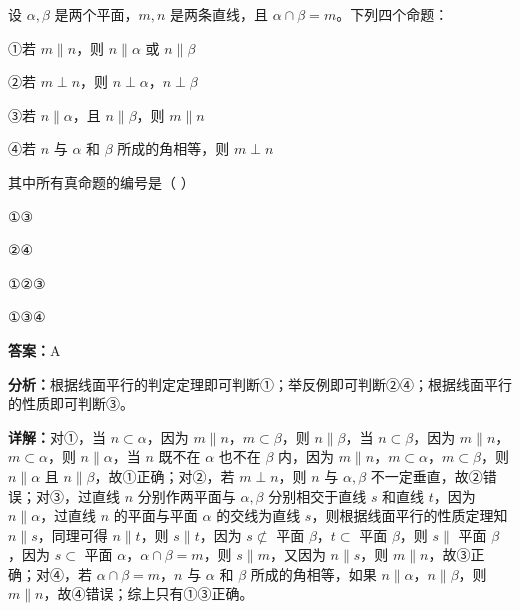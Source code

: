 \begin{question}[points=5]
设 $\alpha,\beta$ 是两个平面，$m,n$ 是两条直线，且 $\alpha\cap\beta=m$。下列四个命题：

①若 $m\parallel n$，则 $n\parallel\alpha$ 或 $n\parallel\beta$

②若 $m\perp n$，则 $n\perp\alpha$，$n\perp\beta$

③若 $n\parallel\alpha$，且 $n\parallel\beta$，则 $m\parallel n$

④若 $n$ 与 $\alpha$ 和 $\beta$ 所成的角相等，则 $m\perp n$

其中所有真命题的编号是（   ）
\begin{choices}
  \item ①③
  \item ②④
  \item ①②③
  \item ①③④
\end{choices}
\begin{solution}
\textbf{答案：}A

\textbf{分析：}根据线面平行的判定定理即可判断①；举反例即可判断②④；根据线面平行的性质即可判断③。

\textbf{详解：}对①，当 $n\subset\alpha$，因为 $m\parallel n$，$m\subset\beta$，则 $n\parallel\beta$，当 $n\subset\beta$，因为 $m\parallel n$，$m\subset\alpha$，则 $n\parallel\alpha$，当 $n$ 既不在 $\alpha$ 也不在 $\beta$ 内，因为 $m\parallel n$，$m\subset\alpha$，$m\subset\beta$，则 $n\parallel\alpha$ 且 $n\parallel\beta$，故①正确；对②，若 $m\perp n$，则 $n$ 与 $\alpha,\beta$ 不一定垂直，故②错误；对③，过直线 $n$ 分别作两平面与 $\alpha,\beta$ 分别相交于直线 $s$ 和直线 $t$，因为 $n\parallel\alpha$，过直线 $n$ 的平面与平面 $\alpha$ 的交线为直线 $s$，则根据线面平行的性质定理知 $n\parallel s$，同理可得 $n\parallel t$，则 $s\parallel t$，因为 $s\not\subset$ 平面 $\beta$，$t\subset$ 平面 $\beta$，则 $s\parallel$ 平面 $\beta$，因为 $s\subset$ 平面 $\alpha$，$\alpha\cap\beta=m$，则 $s\parallel m$，又因为 $n\parallel s$，则 $m\parallel n$，故③正确；对④，若 $\alpha\cap\beta=m$，$n$ 与 $\alpha$ 和 $\beta$ 所成的角相等，如果 $n\parallel\alpha$，$n\parallel\beta$，则 $m\parallel n$，故④错误；综上只有①③正确。
\end{solution}
\end{question}

